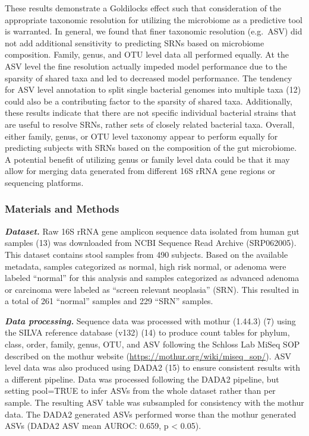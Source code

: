 \documentclass[
]{article}
\begin{document}
These results demonstrate a Goldilocks effect such that consideration of
the appropriate taxonomic resolution for utilizing the microbiome as a
predictive tool is warranted. In general, we found that finer taxonomic
resolution (e.g.~ASV) did not add additional sensitivity to predicting
SRNs based on microbiome composition. Family, genus, and OTU level data
all performed equally. At the ASV level the fine resolution actually
impeded model performance due to the sparsity of shared taxa and led to
decreased model performance. The tendency for ASV level annotation to
split single bacterial genomes into multiple taxa (12) could also be a
contributing factor to the sparsity of shared taxa. Additionally, these
results indicate that there are not specific individual bacterial
strains that are useful to resolve SRNs, rather sets of closely related
bacterial taxa. Overall, either family, genus, or OTU level taxonomy
appear to perform equally for predicting subjects with SRNs based on the
composition of the gut microbiome. A potential benefit of utilizing
genus or family level data could be that it may allow for merging data
generated from different 16S rRNA gene regions or sequencing platforms.

\hypertarget{materials-and-methods}{%
\subsubsection{Materials and Methods}\label{materials-and-methods}}

\textbf{\emph{Dataset.}} Raw 16S rRNA gene amplicon sequence data
isolated from human gut samples (13) was downloaded from NCBI Sequence
Read Archive (SRP062005). This dataset contains stool samples from 490
subjects. Based on the available metadata, samples categorized as
normal, high risk normal, or adenoma were labeled ``normal'' for this
analysis and samples categorized as advanced adenoma or carcinoma were
labeled as ``screen relevant neoplasia'' (SRN). This resulted in a total
of 261 ``normal'' samples and 229 ``SRN'' samples.

\textbf{\emph{Data processing.}} Sequence data was processed with mothur
(1.44.3) (7) using the SILVA reference database (v132) (14) to produce
count tables for phylum, class, order, family, genus, OTU, and ASV
following the Schloss Lab MiSeq SOP described on the mothur website
(\url{https://mothur.org/wiki/miseq_sop/}). ASV level data was also
produced using DADA2 (15) to ensure consistent results with a different
pipeline. Data was processed following the DADA2 pipeline, but setting
pool=TRUE to infer ASVs from the whole dataset rather than per sample.
The resulting ASV table was subsampled for consistency with the mothur
data. The DADA2 generated ASVs performed worse than the mothur generated
ASVs (DADA2 ASV mean AUROC: 0.659, p \textless{} 0.05).
\end{document}
